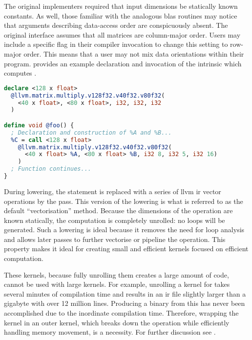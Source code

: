 \documentclass[\main/thesis.tex]{subfiles}
\begin{document}
The original implementers required that input dimensions be statically known constants.
As well, those familiar with the analogous \gls{blas} routines may notice that arguments describing data-access order are conspicuously absent.
The original interface assumes that all matrices are column-major order.
Users may include a specific flag in their compiler invocation to change this setting to row-major order.
This means that a user may not mix data orientations within their program.
 provides an example declaration and invocation of the intrinsic which computes .

\begin{lstlisting}[caption={[Example Declaration and Use of \code{llvm.matrix.multiply.*}]An example declaration and usage of the \code{llvm.matrix.multiply.*} intrinsic.},
      label=lst:matMulIntr,language=llvm,float,columns=flexible]
declare <128 x float>
  @llvm.matrix.multiply.v128f32.v40f32.v80f32(
    <40 x float>, <80 x float>, i32, i32, i32
  )

define void @foo() {
  ; Declaration and construction of %A and %B...
  %C = call <128 x float>
    @llvm.matrix.multiply.v128f32.v40f32.v80f32(
      <40 x float> %A, <80 x float> %B, i32 8, i32 5, i32 16)
    )
  ; Function continues...
}
\end{lstlisting}

During lowering, the  statement is replaced with a series of \gls{llvm} \gls{ir} vector operations by the  pass.
This version of the lowering is what is referred to as the default ``vectorisation'' method.
Because the dimensions of the operation are known statically, the computation is completely unrolled: no loops will be generated.
Such a lowering is ideal because it removes the need for loop analysis and allows later passes to further vectorise or pipeline the operation.
This property makes it ideal for creating small and efficient kernels focused on efficient computation.

These kernels, because fully unrolling them creates a large amount of code, cannot be used with large kernels.
For example, unrolling a kernel for  takes several minutes of compilation time and results in an \gls{ir} file slightly larger than a gigabyte with over 12 million lines.
Producing a binary from this has never been accomplished due to the inordinate compilation time.
Therefore, wrapping the kernel in an outer kernel, which breaks down the operation while efficiently handling memory movement, is a necessity.
For further discussion see .
\end{document}
